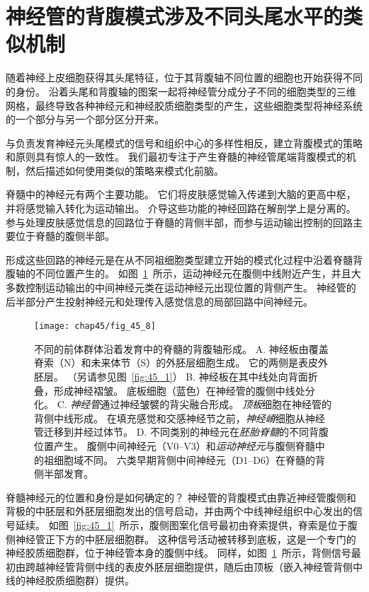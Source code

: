 \section{神经管的背腹模式涉及不同头尾水平的类似机制}

随着神经上皮细胞获得其头尾特征，位于其背腹轴不同位置的细胞也开始获得不同的身份。
沿着头尾和背腹轴的图案一起将神经管分成分子不同的细胞类型的三维网格，最终导致各种神经元和神经胶质细胞类型的产生，这些细胞类型将神经系统的一个部分与另一个部分区分开来。


与负责发育神经元头尾模式的信号和组织中心的多样性相反，建立背腹模式的策略和原则具有惊人的一致性。
我们最初专注于产生脊髓的神经管尾端背腹模式的机制，然后描述如何使用类似的策略来模式化前脑。


脊髓中的神经元有两个主要功能。
它们将皮肤感觉输入传递到大脑的更高中枢，并将感觉输入转化为运动输出。
介导这些功能的神经回路在解剖学上是分离的。
参与处理皮肤感觉信息的回路位于脊髓的背侧半部，而参与运动输出控制的回路主要位于脊髓的腹侧半部。


形成这些回路的神经元是在从不同祖细胞类型建立开始的模式化过程中沿着脊髓背腹轴的不同位置产生的。
如图~\ref{fig:45_8}~所示，运动神经元在腹侧中线附近产生，并且大多数控制运动输出的中间神经元类在运动神经元出现位置的背侧产生。
神经管的后半部分产生投射神经元和处理传入感觉信息的局部回路中间神经元。


\begin{figure}[htbp]
	\centering
	\texttt{[image: chap45/fig\_45\_8]}
	\caption{不同的前体群体沿着发育中的脊髓的背腹轴形成。
		A. 神经板由覆盖脊索（N）和未来体节（S）的外胚层细胞生成。
		它的两侧是表皮外胚层。
		（另请参见图~\ref{fig:45_1}）
		B. 神经板在其中线处向背面折叠，形成神经褶皱。
		底板细胞（蓝色）在神经管的腹侧中线处分化。
		C. \textit{神经管}通过神经皱襞的背尖融合形成。
		\textit{顶板}细胞在神经管的背侧中线形成。
		在填充感觉和交感神经节之前，\textit{神经嵴}细胞从神经管迁移到并经过体节。
		D. 不同类别的神经元在\textit{胚胎脊髓}的不同背腹位置产生。
		腹侧中间神经元（V0–V3）和\textit{运动神经元}与腹侧脊髓中的祖细胞域不同。
		六类早期背侧中间神经元（D1–D6）在脊髓的背侧半部发育\cite{goulding2002formation}。}
	\label{fig:45_8}
\end{figure}


脊髓神经元的位置和身份是如何确定的？
神经管的背腹模式由靠近神经管腹侧和背极的中胚层和外胚层细胞发出的信号启动，并由两个中线神经组织中心发出的信号延续。
如图~\ref{fig:45_1}~所示，腹侧图案化信号最初由脊索提供，脊索是位于腹侧神经管正下方的中胚层细胞群。
这种信号活动被转移到底板，这是一个专门的神经胶质细胞群，位于神经管本身的腹侧中线。
同样，如图~\ref{fig:45_8}~所示，背侧信号最初由跨越神经管背侧中线的表皮外胚层细胞提供，随后由顶板（嵌入神经管背侧中线的神经胶质细胞群）提供。


